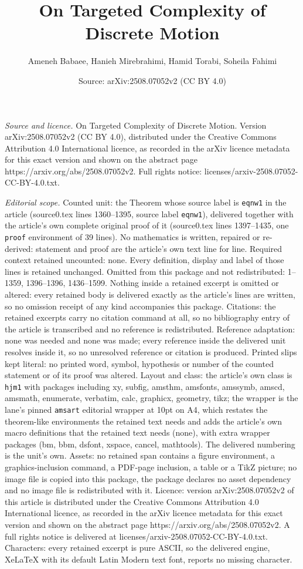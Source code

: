 \documentclass[10pt,a4paper]{amsart}
\title[On Targeted Complexity of Discrete Motion]{On Targeted Complexity of Discrete Motion}
\author{Ameneh Babaee, Hanieh Mirebrahimi, Hamid Torabi, Soheila Fahimi}
\date{Source: arXiv:2508.07052v2 (CC BY 4.0)}
\begin{document}
\maketitle

\noindent\emph{Source and licence.} On Targeted Complexity of Discrete Motion. Version arXiv:2508.07052v2 (CC BY 4.0), distributed under the Creative Commons Attribution 4.0 International licence, as recorded in the arXiv licence metadata for this exact version and shown on the abstract page https://arxiv.org/abs/2508.07052v2. Full rights notice: licenses/arxiv-2508.07052-CC-BY-4.0.txt.\par\smallskip

\noindent\textit{Editorial scope.} Counted unit: the Theorem whose source label is \texttt{eqnw1} in the article (source0.tex lines 1360--1395, source label \texttt{eqnw1}), delivered together with the article's own complete original proof of it (source0.tex lines 1397--1435, one \texttt{proof} environment of 39 lines). No mathematics is written, repaired or re-derived: statement and proof are the article's own text line for line. Required context retained uncounted: none. Every definition, display and label of those lines is retained unchanged. Omitted from this package and not redistributed: 1--1359, 1396--1396, 1436--1599. Nothing inside a retained excerpt is omitted or altered: every retained body is delivered exactly as the article's lines are written, so no omission receipt of any kind accompanies this package. Citations: the retained excerpts carry no citation command at all, so no bibliography entry of the article is transcribed and no reference is redistributed. Reference adaptation: none was needed and none was made; every reference inside the delivered unit resolves inside it, so no unresolved reference or citation is produced. Printed slips kept literal: no printed word, symbol, hypothesis or number of the counted statement or of its proof was altered. Layout and class: the article's own class is \texttt{hjm1} with packages including xy, subfig, amsthm, amsfonts, amssymb, amscd, amsmath, enumerate, verbatim, calc, graphicx, geometry, tikz; the wrapper is the lane's pinned \texttt{amsart} editorial wrapper at 10pt on A4, which restates the theorem-like environments the retained text needs and adds the article's own macro definitions that the retained text needs (none), with extra wrapper packages (bm, bbm, dsfont, xspace, cancel, mathtools). The delivered numbering is the unit's own. Assets: no retained span contains a figure environment, a graphics-inclusion command, a PDF-page inclusion, a table or a TikZ picture; no image file is copied into this package, the package declares no asset dependency and no image file is redistributed with it. Licence: version arXiv:2508.07052v2 of this article is distributed under the Creative Commons Attribution 4.0 International licence, as recorded in the arXiv licence metadata for this exact version and shown on the abstract page https://arxiv.org/abs/2508.07052v2. A full rights notice is delivered at licenses/arxiv-2508.07052-CC-BY-4.0.txt. Characters: every retained excerpt is pure ASCII, so the delivered engine, XeLaTeX with its default Latin Modern text font, reports no missing character.
\end{document}
